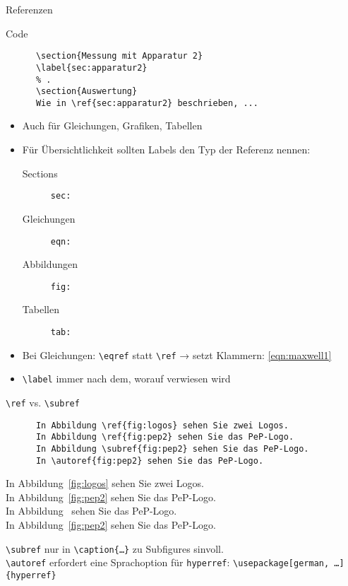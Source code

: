 \begin{frame}[fragile]{Referenzen}
  \begin{block}{Code}
    \begin{lstlisting}
      \section{Messung mit Apparatur 2}
      \label{sec:apparatur2}
      % .
      \section{Auswertung}
      Wie in \ref{sec:apparatur2} beschrieben, ...
    \end{lstlisting}
  \end{block}
  \begin{itemize}
    \item Auch für Gleichungen, Grafiken, Tabellen
    \item Für Übersichtlichkeit sollten Labels den Typ der Referenz nennen:
      \begin{description}
        \item[Sections]    \texttt{sec:}
        \item[Gleichungen] \texttt{eqn:}
        \item[Abbildungen] \texttt{fig:}
        \item[Tabellen]    \texttt{tab:}
      \end{description}
    \item Bei Gleichungen: \lstinline+\eqref+ statt \lstinline+\ref+ → setzt Klammern: \eqref{eqn:maxwell1}
    \item \lstinline+\label+ immer nach dem, worauf verwiesen wird
  \end{itemize}
\end{frame}

\begin{frame}[fragile]{\texttt{\backslash ref} vs. \texttt{\backslash subref}}
  \begin{CodeExample}{0.47}
    \begin{lstlisting}
      In Abbildung \ref{fig:logos} sehen Sie zwei Logos.
      In Abbildung \ref{fig:pep2} sehen Sie das PeP-Logo.
      In Abbildung \subref{fig:pep2} sehen Sie das PeP-Logo.
      In \autoref{fig:pep2} sehen Sie das PeP-Logo.
    \end{lstlisting}
    \CodeResult
      \strut
      In Abbildung~\ref{fig:logos} sehen Sie zwei Logos. \\[\baselineskip]
      In Abbildung~\ref{fig:pep2} sehen Sie das PeP-Logo. \\[\baselineskip]
      In Abbildung~ sehen Sie das PeP-Logo.\\[\baselineskip]
      In Abbildung~\ref{fig:pep2} sehen Sie das PeP-Logo.
  \end{CodeExample}
  \vspace{2em}
  \lstinline+\subref+ nur in \lstinline+\caption{…}+ zu Subfigures sinvoll. \\
  \lstinline+\autoref+ erfordert eine Sprachoption für \lstinline+hyperref+: \lstinline+\usepackage[german, …]{hyperref}+  \\
\end{frame}

